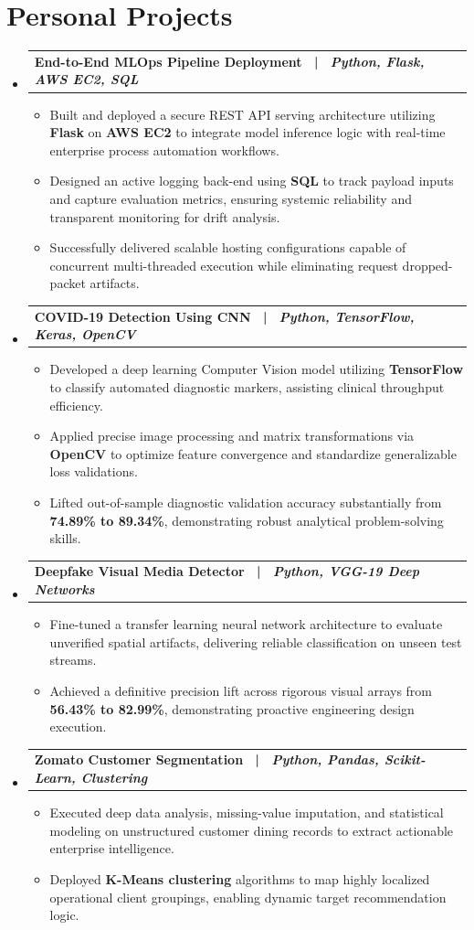 \documentclass[letterpaper,11pt]{article}
\makeatletter
\newcommand{\resumeItem}[1]{
  \item\small{
    {#1 \vspace{-3pt}}
  }
}
\newcommand{\resumeProjectHeading}[2]{
  \vspace{-3pt}\item
    \begin{tabular*}{1.0\textwidth}[t]{l@{\extracolsep{\fill}}r}
      \textbf{#1} & \textbf{\small #2} \\
    \end{tabular*}\vspace{-7pt}
}
\newcommand{\resumeSubHeadingListStart}{\begin{itemize}[leftmargin=0.0in, label={}]}
\newcommand{\resumeSubHeadingListEnd}{\end{itemize}}
\newcommand{\resumeItemListStart}{\begin{itemize}}
\newcommand{\resumeItemListEnd}{\end{itemize}\vspace{0pt}}
\makeatother
\begin{document}
\section{Personal Projects}
  \resumeSubHeadingListStart
    \resumeProjectHeading
      {\textbf{End-to-End MLOps Pipeline Deployment} ~|~ \textit{Python, Flask, AWS EC2, SQL}}{}
      \resumeItemListStart
        \resumeItem{Built and deployed a secure REST API serving architecture utilizing \textbf{Flask} on \textbf{AWS EC2} to integrate model inference logic with real-time enterprise process automation workflows.}
        \resumeItem{Designed an active logging back-end using \textbf{SQL} to track payload inputs and capture evaluation metrics, ensuring systemic reliability and transparent monitoring for drift analysis.}
        \resumeItem{Successfully delivered scalable hosting configurations capable of concurrent multi-threaded execution while eliminating request dropped-packet artifacts.}
      \resumeItemListEnd

    \resumeProjectHeading
      {\textbf{COVID-19 Detection Using CNN} ~|~ \textit{Python, TensorFlow, Keras, OpenCV}}{}
      \resumeItemListStart
        \resumeItem{Developed a deep learning Computer Vision model utilizing \textbf{TensorFlow} to classify automated diagnostic markers, assisting clinical throughput efficiency.}
        \resumeItem{Applied precise image processing and matrix transformations via \textbf{OpenCV} to optimize feature convergence and standardize generalizable loss validations.}
        \resumeItem{Lifted out-of-sample diagnostic validation accuracy substantially from \textbf{74.89\% to 89.34\%}, demonstrating robust analytical problem-solving skills.}
      \resumeItemListEnd

    \resumeProjectHeading
      {\textbf{Deepfake Visual Media Detector} ~|~ \textit{Python, VGG-19 Deep Networks}}{}
      \resumeItemListStart
        \resumeItem{Fine-tuned a transfer learning neural network architecture to evaluate unverified spatial artifacts, delivering reliable classification on unseen test streams.}
        \resumeItem{Achieved a definitive precision lift across rigorous visual arrays from \textbf{56.43\% to 82.99\%}, demonstrating proactive engineering design execution.}
      \resumeItemListEnd

    \resumeProjectHeading
      {\textbf{Zomato Customer Segmentation} ~|~ \textit{Python, Pandas, Scikit-Learn, Clustering}}{}
      \resumeItemListStart
        \resumeItem{Executed deep data analysis, missing-value imputation, and statistical modeling on unstructured customer dining records to extract actionable enterprise intelligence.}
        \resumeItem{Deployed \textbf{K-Means clustering} algorithms to map highly localized operational client groupings, enabling dynamic target recommendation logic.}
      \resumeItemListEnd
  \resumeSubHeadingListEnd
\end{document}
